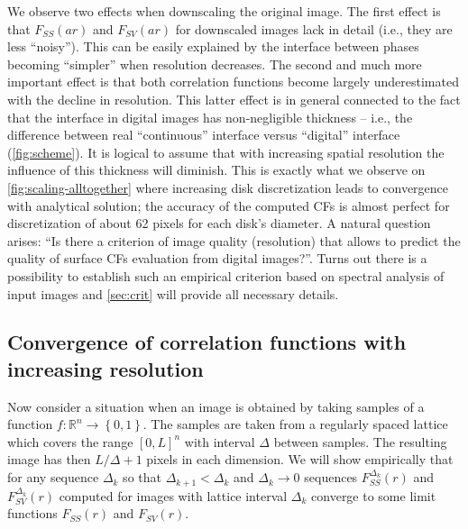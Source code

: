 \documentclass[reprint,amsmath,amssymb,aps,pre,showkeys,showpacs]{revtex4-1}
\begin{document}
We observe two effects when downscaling the original image. The
first effect is that $F_{SS}(ar)$ and $F_{SV}(ar)$ for downscaled images lack in
detail (i.e., they are less ``noisy''). This can be easily explained by the
interface between phases becoming ``simpler'' when resolution decreases. The
second and much more important effect is that both correlation functions become
largely underestimated with the decline in resolution. This latter effect is in
general connected to the fact that the interface in digital images has
non-negligible thickness -- i.e., the difference between real ``continuous''
interface versus ``digital'' interface (\cref{fig:scheme}). It is logical to
assume that with increasing spatial resolution the influence of this thickness
will diminish. This is exactly what we observe on \cref{fig:scaling-alltogether}
where increasing disk discretization leads to convergence with analytical
solution; the accuracy of the computed CFs is almost perfect for discretization
of about 62 pixels for each disk's diameter. A natural question arises: ``Is
there a criterion of image quality (resolution) that allows to predict the
quality of surface CFs evaluation from digital images?''. Turns out there is a
possibility to establish such an empirical criterion based on spectral analysis
of input images and \cref{sec:crit} will provide all necessary details.

\subsection{Convergence of correlation functions with increasing resolution}
\label{sec:value-noise}
Now consider a situation when an image is obtained by taking samples of a function
$f: \mathbb{R}^n \rightarrow \left\{0, 1\right\}$. The samples are taken from a
regularly spaced lattice which covers the range $[0, L]^n$  with interval
$\Delta$ between samples. The resulting image has then $L/\Delta + 1$ pixels in
each dimension. We will show empirically that for any sequence $\Delta_k$ so
that $\Delta_{k+1} < \Delta_k$ and $\Delta_k \rightarrow 0$ sequences
$F_{SS}^{\Delta_k}(r)$ and $F_{SV}^{\Delta_k}(r)$ computed for images with
lattice interval $\Delta_k$ converge to some limit functions $F_{SS}(r)$ and
$F_{SV}(r)$.
\end{document}
